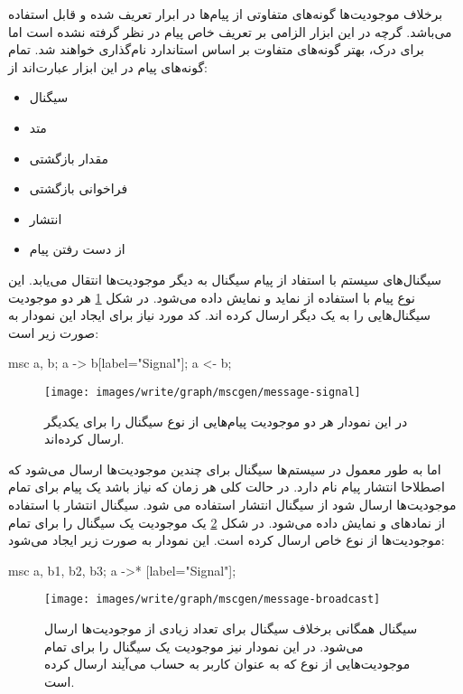 برخلاف موجودیت‌ها گونه‌های متفاوتی از پیام‌ها در ابرار  تعریف شده و
قابل استفاده می‌باشد. گرچه در این ابزار الزامی بر تعریف خاص پیام در نظر گرفته
نشده است اما برای درک، بهتر گونه‌های متفاوت بر اساس استاندارد 
نام‌گذاری خواهند شد. تمام گونه‌های پیام در این ابزار عبارت‌اند از:

\begin{itemize}
  \item سیگنال
  \item متد
  \item مقدار بازگشتی
  \item فراخوانی بازگشتی
  \item انتشار
  \item از دست رفتن پیام
\end{itemize}

سیگنال‌های سیستم با استفاد از پیام سیگنال به دیگر موجودیت‌ها انتقال می‌یابد. این
نوع پیام با استفاده از نماید \lr{->} و \lr{<-} نمایش داده می‌شود. در شکل
\ref{write/graph/mscgen/message-signal} هر دو موجودیت سیگنال‌هایی را به یک دیگر
ارسال کرده اند. کد مورد نیاز برای ایجاد این نمودار به صورت زیر است:

\begin{MSC}
msc{
	a, b;
	a -> b[label="Signal"];
	a <- b;
}
\end{MSC}

\begin{figure}[h]
\centering
\texttt{[image: images/write/graph/mscgen/message-signal]}
\caption[پیام نوع سیگنال]{
	در این نمودار هر دو موجودیت پیام‌هایی از نوع سیگنال را برای یکدیگر ارسال
	کرده‌اند.
}
\label{write/graph/mscgen/message-signal}
\end{figure}

اما به طور معمول در سیستم‌ها سیگنال برای چندین موجودیت‌ها ارسال می‌شود
که اصطلاحا انتشار پیام نام دارد. در حالت کلی هر زمان که نیاز باشد یک پیام برای
تمام موجودیت‌ها ارسال شود از سیگنال انتشار استفاده می شود. سیگنال انتشار با
استفاده از نمادهای \lr{->*} و \lr{*<-} نمایش داده می‌شود. در شکل
\ref{write/graph/mscgen/message-broadcast} یک موجودیت یک سیگنال را برای تمام
موجودیت‌ها از نوع خاص ارسال کرده است. این نمودار به صورت زیر ایجاد می‌شود:

\begin{MSC}
msc{
	a, b1, b2, b3;
	a ->* [label="Signal"];
}
\end{MSC}

\begin{figure}[h]
\centering
\texttt{[image: images/write/graph/mscgen/message-broadcast]}
\caption[پیام نوع سیگنال همگانی]{
	سیگنال همگانی برخلاف سیگنال برای تعداد زیادی از موجودیت‌ها ارسال می‌شود. در این
	نمودار نیز موجودیت  یک سیگنال را برای تمام موجودیت‌هایی از نوع
	که به عنوان کاربر به حساب می‌آیند ارسال کرده است.
	}
\label{write/graph/mscgen/message-broadcast}
\end{figure}

